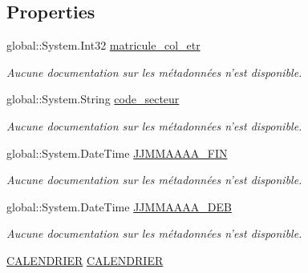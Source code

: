\subsection*{Properties}
\begin{DoxyCompactItemize}
\item 
global\-::\-System.\-Int32 \hyperlink{class_model_1_1_e_t_r_e___r_e_s_p_o_n_s_a_b_l_e_a91950cf430a908f316fe4273dd78ab88}{matricule\-\_\-col\-\_\-etr}
\begin{DoxyCompactList}\small\item\em Aucune documentation sur les métadonnées n'est disponible. \end{DoxyCompactList}\item 
global\-::\-System.\-String \hyperlink{class_model_1_1_e_t_r_e___r_e_s_p_o_n_s_a_b_l_e_a30b273a91b5e42411cf4022a07490c2e}{code\-\_\-secteur}
\begin{DoxyCompactList}\small\item\em Aucune documentation sur les métadonnées n'est disponible. \end{DoxyCompactList}\item 
global\-::\-System.\-Date\-Time \hyperlink{class_model_1_1_e_t_r_e___r_e_s_p_o_n_s_a_b_l_e_aeaa7b22df873713292df37af00ba56ca}{J\-J\-M\-M\-A\-A\-A\-A\-\_\-\-F\-I\-N}
\begin{DoxyCompactList}\small\item\em Aucune documentation sur les métadonnées n'est disponible. \end{DoxyCompactList}\item 
global\-::\-System.\-Date\-Time \hyperlink{class_model_1_1_e_t_r_e___r_e_s_p_o_n_s_a_b_l_e_a92345b0b6cee5b2742df44b3a0c85ecb}{J\-J\-M\-M\-A\-A\-A\-A\-\_\-\-D\-E\-B}
\begin{DoxyCompactList}\small\item\em Aucune documentation sur les métadonnées n'est disponible. \end{DoxyCompactList}\item 
\hyperlink{class_model_1_1_c_a_l_e_n_d_r_i_e_r}{C\-A\-L\-E\-N\-D\-R\-I\-E\-R} \hyperlink{class_model_1_1_e_t_r_e___r_e_s_p_o_n_s_a_b_l_e_a83b6740c4abe967975f20f4b3139daf2}{C\-A\-L\-E\-N\-D\-R\-I\-E\-R}

\end{DoxyCompactItemize}
